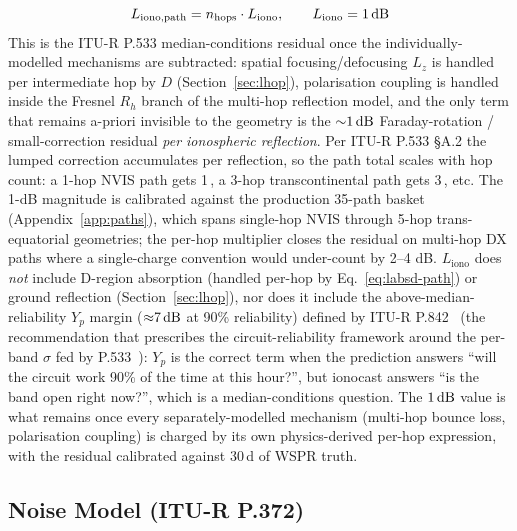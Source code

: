 \documentclass[11pt,a4paper]{article}
\newcommand{\SI}[2]{#1\,\text{#2}}
\newcommand{\dB}{\text{dB}}
\begin{document}
\begin{equation}
  L_{\text{iono,path}} = n_{\text{hops}} \cdot L_{\text{iono}},
  \qquad L_{\text{iono}} = \SI{1}{\dB}
\end{equation}
This is the ITU-R P.533 median-conditions residual once the
individually-modelled mechanisms are subtracted: spatial
focusing/defocusing $L_z$ is handled per intermediate hop by
$D$ (Section~\ref{sec:lhop}), polarisation coupling is handled
inside the Fresnel $R_h$ branch of the multi-hop reflection model,
and the only term that remains a-priori invisible to the geometry is
the ${\sim}\SI{1}{\dB}$ Faraday-rotation / small-correction residual
\emph{per ionospheric reflection}.  Per ITU-R P.533 §A.2 the lumped
correction accumulates per reflection, so the path total scales with
hop count: a 1-hop NVIS path gets \SI{1}{\dB}, a 3-hop transcontinental
path gets \SI{3}{\dB}, etc.  The 1-dB magnitude is calibrated
against the production 35-path basket (Appendix~\ref{app:paths}),
which spans single-hop NVIS through 5-hop trans-equatorial
geometries; the per-hop multiplier closes the residual on
multi-hop DX paths where a single-charge convention would
under-count by 2--4 dB.
$L_{\text{iono}}$ does \emph{not} include D-region absorption
(handled per-hop by Eq.~\ref{eq:labsd-path}) or ground reflection
(Section~\ref{sec:lhop}), nor does it include the
above-median-reliability $Y_p$ margin
(${\approx}\SI{7}{\dB}$ at 90\% reliability) defined by ITU-R
P.842~\cite{itup842} (the recommendation that prescribes the
circuit-reliability framework around the per-band $\sigma$
fed by P.533~\cite{itup533}): $Y_p$ is the correct term when
the prediction answers
``will the circuit work 90\% of the time at this hour?'', but ionocast
answers ``is the band open right now?'', which is a median-conditions
question.  The $\SI{1}{\dB}$ value is what remains once every
separately-modelled mechanism (multi-hop bounce loss,
polarisation coupling) is charged by its own physics-derived
per-hop expression, with the residual calibrated against 30\,d
of WSPR truth.

\subsection{Noise Model (ITU-R P.372)}\label{sec:noise}
\end{document}
